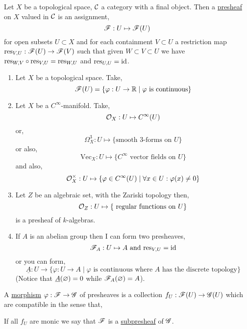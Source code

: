 \documentclass[12pt]{article}
\begin{document}
\begin{defn}
Let $X$ be a topological space, $\mathcal{C}$ a category with a final object. Then a \underline{presheaf} on $X$ valued in $\mathcal{C}$ is an assignment,
\[ \mathscr{F} : U \mapsto \mathscr{F}(U) \]
for open subsets $U \subset X$ and for each containment $V \subset U$ a restriction map $\mathrm{res}_{V,U} : \mathscr{F}(U) \to \mathscr{F}(V)$ such that given $W \subset V \subset U$ we have $\mathrm{res}_{W,V} \circ \mathrm{res}_{V,U} = \mathrm{res}_{W,U}$ and $\mathrm{res}_{U,U} = \mathrm{id}$.
\end{defn}

\begin{example}
\begin{enumerate}
\item Let $X$ be a topological space. Take,
\[ \mathscr{F}(U) = \{ \varphi : U \to \mathbb{R} \mid \varphi \text{ is continuous} \} \]
\item Let $X$ be a $C^\infty$-manifold. Take,
\[ \mathcal{O}_{X} : U \mapsto C^\infty(U) \]
or,
\[ \Omega^3_X : U \mapsto \{ \text{smooth 3-forms on } U \} \]
or also,
\[ \mathrm{Vec}_X : U \mapsto \{ C^\infty \text{ vector fields on } U \} \]
and also,
\[ \mathcal{O}_{X}^\times : U \mapsto \{ \varphi \in C^\infty(U) \mid \forall x \in U : \varphi(x) \neq 0 \} \]
\item Let $Z$ be an algebraic set, with the Zariski topology then,
\[ \mathcal{O}_{Z} : U \mapsto \{ \text{ regular functions on } U \} \]
is a presheaf of $k$-algebras.
\item If $A$ is an abelian group then I can form two presheaves,
\[ \mathscr{F}_A : U \mapsto A \text{ and } \mathrm{res}_{V,U} = \mathrm{id} \]
or you can form,
\[ \underline{A} : U \to \{ \varphi : U \to A \mid \varphi \text{ is continuous where } A \text{ has the discrete topology} \} \]
(Notice that $\underline{A}(\varnothing) = 0$ while $\mathscr{F}_A(\varnothing) = A$). 
\end{enumerate}
\end{example}

\begin{defn}
A \underline{morphism} $\varphi : \mathscr{F} \to \mathscr{G}$ of presheaves is a collection $f_U : \mathscr{F}(U) \to \mathscr{G}(U)$ which are compatible in the sense that,
\begin{center}
\end{center}
If all $f_U$ are monic we say that $\mathscr{F}$ is a \underline{subpresheaf} of $\mathscr{G}$.
\end{defn}
\end{document}
